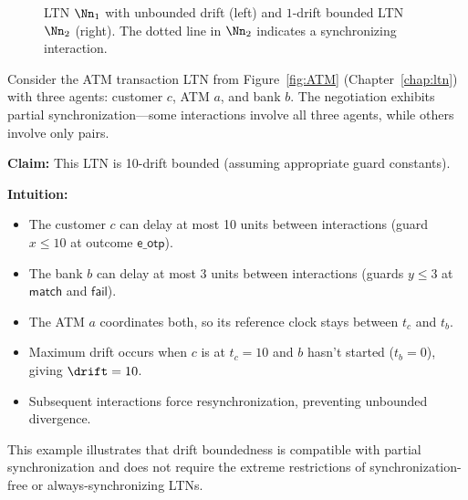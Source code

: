 \begin{example}
\begin{figure}[h]
\begin{minipage}{.45\textwidth}
        \end{minipage}
        \caption{LTN $\Nn_1$ with unbounded drift (left) and $1$-drift bounded LTN $\Nn_2$ (right). The dotted line in $\Nn_2$ indicates a synchronizing interaction.}
            \label{fig:abc}
        \end{figure}
\end{example}

\begin{example}
\label{ex:atm-bounded-drift}
Consider the ATM transaction LTN from Figure~\ref{fig:ATM} (Chapter~\ref{chap:ltn}) with three agents: customer $c$, ATM $a$, and bank $b$. The negotiation exhibits partial synchronization—some interactions involve all three agents, while others involve only pairs.

\textbf{Claim:} This LTN is 10-drift bounded (assuming appropriate guard constants).

\textbf{Intuition:} 
\begin{itemize}
\item The customer $c$ can delay at most 10 units between interactions (guard $x \leq 10$ at outcome $\mathsf{e\_otp}$).
\item The bank $b$ can delay at most 3 units between interactions (guards $y \leq 3$ at $\mathsf{match}$ and $\mathsf{fail}$).
\item The ATM $a$ coordinates both, so its reference clock stays between $t_c$ and $t_b$.
\item Maximum drift occurs when $c$ is at $t_c = 10$ and $b$ hasn't started ($t_b = 0$), giving $\drift = 10$.
\item Subsequent interactions force resynchronization, preventing unbounded divergence.
\end{itemize}

This example illustrates that drift boundedness is compatible with partial synchronization and does not require the extreme restrictions of synchronization-free or always-synchronizing LTNs.
\end{example}

